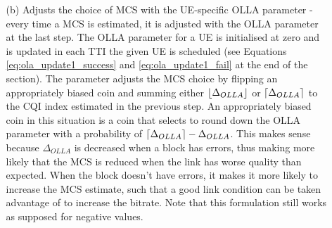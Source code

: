 
\begin{comment}
\begin{itemize}
    \item[1] de
    \item[(a)]  df
    \item[4.] 
\end{itemize}
\end{comment}

\begin{itemize}
    \item[] \begin{itemize} %
        \item[(b)] Adjusts the choice of \ac{MCS} with the UE-specific \ac{OLLA} parameter - every time a MCS is estimated, it is adjusted with the OLLA parameter at the last step. The OLLA parameter for a UE is initialised at zero and is updated in each TTI the given UE is scheduled (see Equations \eqref{eq:ola_update1_success} and \eqref{eq:ola_update1_fail} at the end of the section). The parameter adjusts the MCS choice by flipping an appropriately biased coin and summing either $\lfloor\Delta_{OLLA}\rfloor$ or $\lceil\Delta_{OLLA}\rceil$ to the CQI index estimated in the previous step. An appropriately biased coin in this situation is a coin that selects to round down the OLLA parameter with a probability of $\lceil\Delta_{OLLA}\rceil - \Delta_{OLLA}$. This makes sense because $\Delta_{OLLA}$ is decreased when a block has errors, thus making more likely that the MCS is reduced when the link has worse quality than expected. When the block doesn't have errors, it makes it more likely to increase the MCS estimate, such that a good link condition can be taken advantage of to increase the bitrate. Note that this formulation still works as supposed for negative values.


\end{itemize}
\end{itemize}
